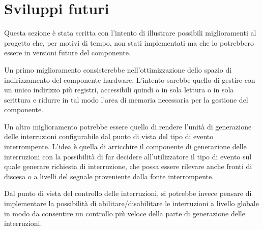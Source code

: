 \documentclass[12pt,a4paper,twoside,openany]{book}
\begin{document}
\section*{Sviluppi futuri}
Questa sezione è stata scritta con l'intento di illustrare possibili miglioramenti al progetto che, per motivi di tempo, non stati implementati ma che lo potrebbero essere in versioni future del componente.

Un primo miglioramento consisterebbe nell'ottimizzazione dello spazio di indirizzamento del componente hardware. L'intento sarebbe quello di gestire con un unico indirizzo più registri, accessibili quindi o in sola lettura o in sola scrittura e ridurre in tal modo l'area di memoria necessaria per la gestione del componente.

Un altro miglioramento potrebbe essere quello di rendere l'unità di generazione delle interruzioni configurabile dal punto di vista del tipo di evento interrompente. L'idea è quella di arricchire il componente di generazione delle interruzioni con la possibilità di far decidere all'utilizzatore il tipo di evento sul quale generare richiesta di interruzione, che possa essere rilevare anche fronti di discesa o a livelli del segnale proveniente dalla fonte interrompente.

Dal punto di vista del controllo delle interruzioni, si potrebbe invece pensare di implementare la possibilità di abilitare/disabilitare le interruzioni a livello globale in modo da consentire un controllo più veloce della parte di generazione delle interruzioni.
\end{document}
